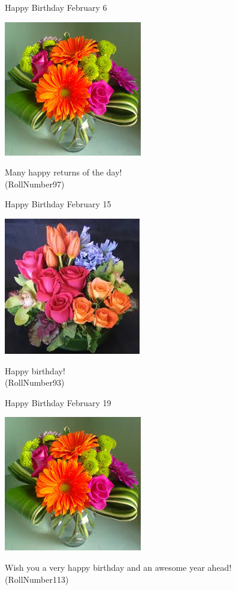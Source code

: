 \documentclass[table, landscape]{beamer}
\begin{document}
\begin{frame}{\color{blue}Happy Birthday }
{February 6}
\begin{center}
\includegraphics[height=0.5\textheight]{flowers/f8.jpeg}

Many happy returns of the day! \\ \vspace{0.5cm}{\Large name90} (RollNumber97)
\end{center}
\end{frame}
\begin{frame}{\color{blue}Happy Birthday }
{February 15}
\begin{center}
\includegraphics[height=0.5\textheight]{flowers/f9.jpeg}

Happy birthday! \\ \vspace{0.5cm}{\Large name86} (RollNumber93)
\end{center}
\end{frame}
\begin{frame}{\color{blue}Happy Birthday }
{February 19}
\begin{center}
\includegraphics[height=0.5\textheight]{flowers/f8.jpeg}

Wish you a very happy birthday and an awesome year ahead! \\ \vspace{0.5cm}{\Large name106} (RollNumber113)
\end{center}
\end{frame}
\end{document}
